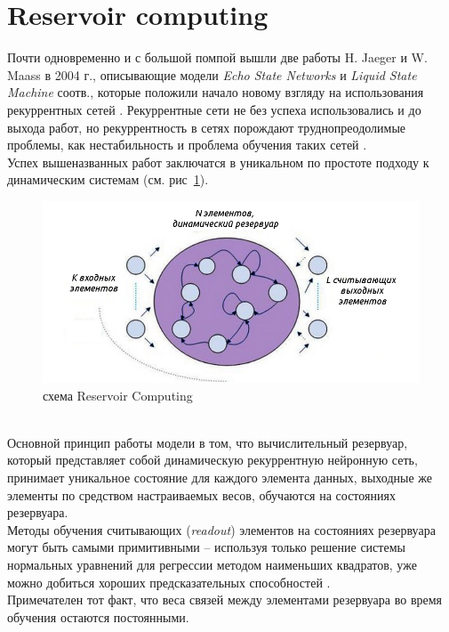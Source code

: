 \documentclass[a4paper,10pt]{article}
\begin{document}
\section{Reservoir computing}
\label{sec:res_comp_sec}
Почти одновременно и с большой помпой вышли две работы H. Jaeger \cite{esn} и W. Maass \cite{lsm} в 2004 г., описывающие модели \textit{Echo State Networks} и \textit{Liquid State Machine} соотв., которые положили начало новому взгляду на использования рекуррентных сетей . Рекуррентные сети не без успеха использовались и до выхода работ, но рекуррентность в сетях порождают труднопреодолимые проблемы, как нестабильность и проблема обучения таких сетей \cite{rnn_prob}.\\
\indent Успех вышеназванных работ заключатся в уникальном по простоте подходу к динамическим системам (см. рис~\ref{res_comp}).
\begin{figure}[ht]
\centering
\includegraphics[width=1\linewidth]{res_comp}
\caption{схема Reservoir Computing}
\label{res_comp}
\end{figure} \\
\indent Основной принцип работы модели в том, что вычислительный резервуар, который представляет собой динамическую рекуррентную нейронную сеть, принимает уникальное состояние для каждого элемента данных, выходные же элементы по средством настраиваемых весов, обучаются на состояниях резервуара.\\
\indent Методы обучения считывающих (\textit{readout}) элементов на состояниях резервуара могут быть самыми примитивными -- используя только решение системы нормальных уравнений для регрессии методом наименьших квадратов, уже можно добиться хороших предсказательных способностей \cite{esn_site}.\\
\indent Примечателен тот факт, что веса связей между элементами резервуара во время обучения остаются постоянными. 
\end{document}
